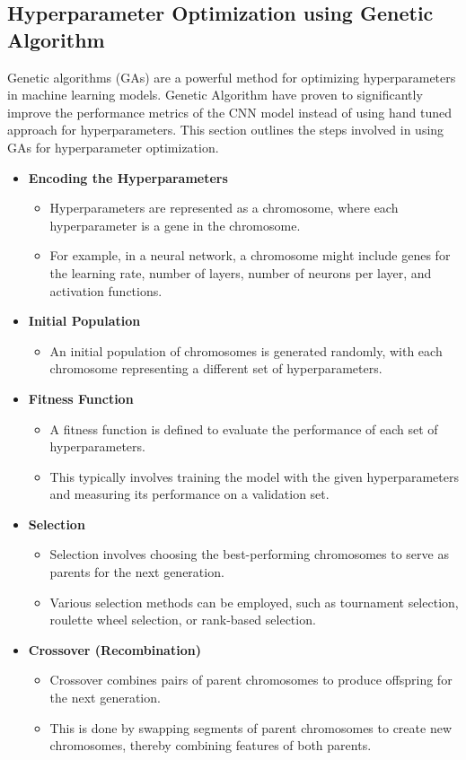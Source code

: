 \subsection{Hyperparameter Optimization using Genetic Algorithm}
Genetic algorithms (GAs) are a powerful method for optimizing hyperparameters in machine learning models. Genetic Algorithm have proven to significantly improve the performance metrics of the CNN model instead of using hand tuned approach for hyperparameters. This section outlines the steps involved in using GAs for hyperparameter optimization\cite{9058307}.
\begin{itemize}
    \item \textbf{Encoding the Hyperparameters}
    \begin{itemize}
        \item Hyperparameters are represented as a chromosome, where each hyperparameter is a gene in the chromosome.
        \item For example, in a neural network, a chromosome might include genes for the learning rate, number of layers, number of neurons per layer, and activation functions.
    \end{itemize}


    \item \textbf{Initial Population}
    \begin{itemize}
        \item An initial population of chromosomes is generated randomly, with each chromosome representing a different set of hyperparameters.
    \end{itemize}

    \item \textbf{Fitness Function}
    \begin{itemize}
        \item A fitness function is defined to evaluate the performance of each set of hyperparameters.
        \item This typically involves training the model with the given hyperparameters and measuring its performance on a validation set.
    \end{itemize}

    \item \textbf{Selection}
    \begin{itemize}
        \item Selection involves choosing the best-performing chromosomes to serve as parents for the next generation.
        \item Various selection methods can be employed, such as tournament selection, roulette wheel selection, or rank-based selection.
    \end{itemize}
    \newpage
    \item \textbf{Crossover (Recombination)}
    \begin{itemize}
        \item Crossover combines pairs of parent chromosomes to produce offspring for the next generation.
        \item This is done by swapping segments of parent chromosomes to create new chromosomes, thereby combining features of both parents.
    \end{itemize}


\end{itemize}
